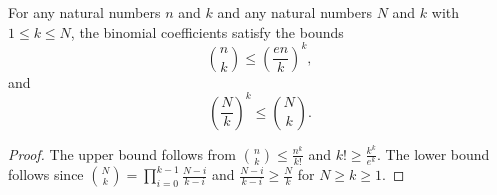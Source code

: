 \begin{lemma}
For any natural numbers \(n\) and \(k\) and any natural numbers \(N\) and \(k\) with \(1\le k\le N\), the binomial coefficients satisfy the bounds
\[
\binom nk \le \left(\frac{en}{k}\right)^k,
\]
and
\[
\left(\frac Nk\right)^k \le \binom Nk.
\]
\end{lemma}
\begin{proof}
The upper bound follows from \(\binom nk \le \frac{n^k}{k!}\) and \(k! \ge \frac{k^k}{e^k}\).
The lower bound follows since \(\binom Nk = \prod_{i=0}^{k-1} \frac{N-i}{k-i}\) and \(\frac{N-i}{k-i} \ge \frac Nk\) for \(N\ge k\ge 1\).
\end{proof}
